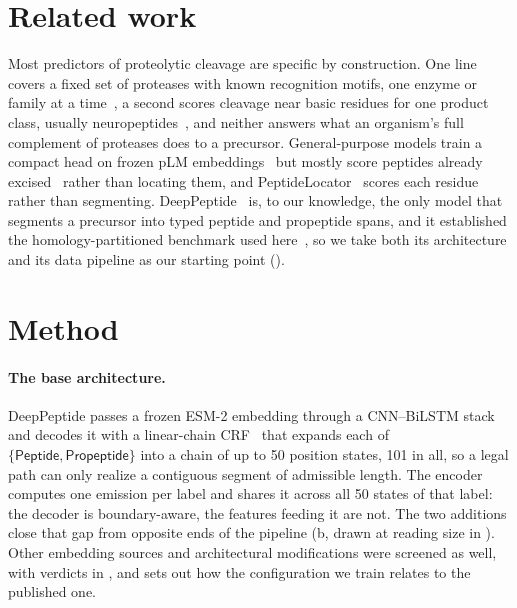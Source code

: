 \documentclass{article}
\begin{document}
\section{Related work}
\label{sec:related}

Most predictors of proteolytic cleavage are specific by construction. One line covers a fixed set of proteases with known recognition motifs, one enzyme or family at a time~\citep{duckert2004prop,song2012prosper,li2023prosperousplus,li2020deepcleave,li2020procleave}, a second scores cleavage near basic residues for one product class, usually neuropeptides~\citep{southey2006neuropred,wang2024deepneuropepred}, and neither answers what an organism's full complement of proteases does to a precursor. General-purpose models train a compact head on frozen pLM embeddings~\citep{lin2023esm2,esm_cambrian_blog_2024} but mostly score peptides already excised~\citep{du2024plm4ace,bpfun2025} rather than locating them, and PeptideLocator~\citep{mooney2013peptidelocator} scores each residue rather than segmenting. DeepPeptide~\citep{deeppeptide2023} is, to our knowledge, the only model that segments a precursor into typed peptide and propeptide spans, and it established the homology-partitioned benchmark used here~\citep{graphpart2023}, so we take both its architecture and its data pipeline as our starting point ().

\section{Method}
\label{sec:method}

\paragraph{The base architecture.} DeepPeptide passes a frozen ESM-2 embedding through a CNN--BiLSTM stack and decodes it with a linear-chain CRF~\citep{lafferty2001crf} that expands each of $\{\textsf{Peptide}, \textsf{Propeptide}\}$ into a chain of up to 50 position states, 101 in all, so a legal path can only realize a contiguous segment of admissible length. The encoder computes one emission per label and shares it across all 50 states of that label: the decoder is boundary-aware, the features feeding it are not. The two additions close that gap from opposite ends of the pipeline (b, drawn at reading size in ). Other embedding sources and architectural modifications were screened as well, with verdicts in , and  sets out how the configuration we train relates to the published one.
\end{document}
